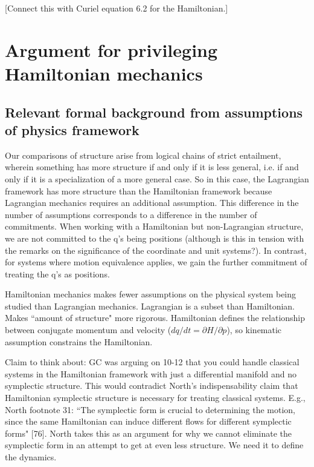 \documentclass[letterpaper]{article}
\begin{document}
[Connect this with Curiel equation 6.2 for the Hamiltonian.]





\section{Argument for privileging Hamiltonian mechanics}

\subsection{Relevant formal background from assumptions of physics framework}

Our comparisons of structure arise from logical chains of strict entailment, wherein something has more structure if and only if it is less general, i.e. if and only if it is a specialization of a more general case. So in this case, the Lagrangian framework has more structure than the Hamiltonian framework because Lagrangian mechanics requires an additional assumption. This difference in the number of assumptions corresponds to a difference in the number of commitments. When working with a Hamiltonian but non-Lagrangian structure, we are not committed to the q's being positions (although is this in tension with the remarks on the significance of the coordinate and unit systems?). In contrast, for systems where motion equivalence applies, we gain the further commitment of treating the q's as positions.

Hamiltonian mechanics makes fewer assumptions on the physical system being studied than Lagrangian mechanics. Lagrangian is a subset than Hamiltonian. Makes ``amount of structure" more rigorous. Hamiltonian defines the relationship between conjugate momentum and velocity ($dq/dt = \partial H / \partial p$), so kinematic assumption constrains the Hamiltonian.


Claim to think about: GC was arguing on 10-12 that you could handle classical systems in the Hamiltonian framework with just a differential manifold and no symplectic structure. This would contradict North's indispensability claim that Hamiltonian symplectic structure is necessary for treating classical systems. E.g., North footnote 31: ``The symplectic form is crucial to determining the motion, since the same Hamiltonian can induce different flows for different symplectic forms" [76]. North takes this as an argument for why we cannot eliminate the symplectic form in an attempt to get at even less structure. We need it to define the dynamics.
\end{document}
